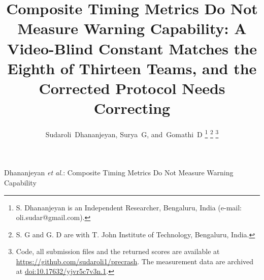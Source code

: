 \title{Composite Timing Metrics Do Not Measure Warning Capability:
A Video-Blind Constant Matches the Eighth of Thirteen Teams, and the
Corrected Protocol Needs Correcting}

\author{Sudaroli~Dhananjeyan,
        Surya~G,
        and~Gomathi~D%
\thanks{S. Dhananjeyan is an Independent Researcher, Bengaluru, India
(e-mail: oli.sudar@gmail.com).}%
\thanks{S. G and G. D are with T. John Institute of Technology, Bengaluru,
India.}%
\thanks{Code, all submission files and the returned scores are available at
\url{https://github.com/sudaroli1/precrash}. The measurement data are archived
at \href{https://doi.org/10.17632/yjvr5c7v3n.1}{doi:10.17632/yjvr5c7v3n.1}.}}

%
{Dhananjeyan \MakeLowercase{\textit{et al.}}: Composite Timing Metrics Do Not Measure Warning Capability}

\maketitle

